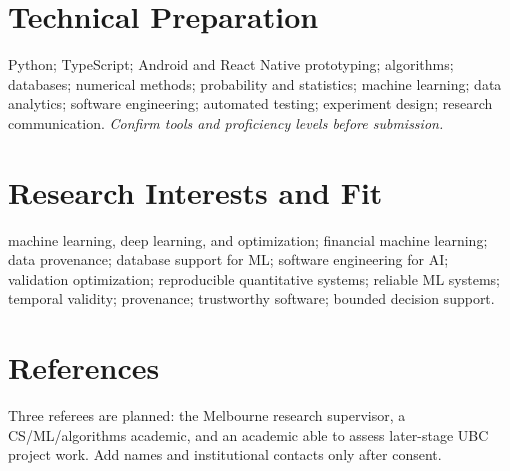 \documentclass[11pt]{article}
\begin{document}
\section*{Technical Preparation}
Python; TypeScript; Android and React Native prototyping; algorithms; databases; numerical methods; probability and statistics; machine learning; data analytics; software engineering; automated testing; experiment design; research communication. \textit{Confirm tools and proficiency levels before submission.}

\section*{Research Interests and Fit}
machine learning, deep learning, and optimization; financial machine learning; data provenance; database support for ML; software engineering for AI; validation optimization; reproducible quantitative systems; reliable ML systems; temporal validity; provenance; trustworthy software; bounded decision support.

\section*{References}
Three referees are planned: the Melbourne research supervisor, a CS/ML/algorithms academic, and an academic able to assess later-stage UBC project work. Add names and institutional contacts only after consent.
\end{document}
